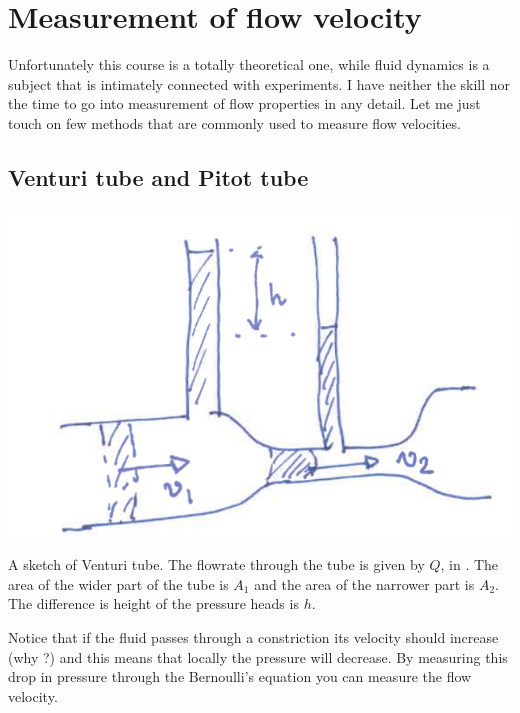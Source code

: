 \section{Measurement of flow velocity}
Unfortunately this course is a totally theoretical one, while fluid
dynamics is a subject that is intimately connected with experiments. I
have neither the skill nor the time to go into measurement of flow
properties in any detail. Let me just touch on few methods that are
commonly used to measure flow velocities. 
\subsection{Venturi tube and Pitot tube}
\begin{marginfigure}
\includegraphics{figures/venturi.png}
\caption{A sketch of Venturi tube. The flowrate through the tube is
  given by $Q$, in . The area of the wider part of
  the tube is $A_1$ and the area of the narrower part is $A_2$. The
  difference is height of the pressure heads is $h$. }
\label{fig:venturi}
\end{marginfigure}
Notice that if the fluid passes through a constriction its velocity
should increase (why ?) and this means that locally the pressure will
decrease. By measuring this drop in pressure through the Bernoulli's
equation you can measure the flow velocity. 

